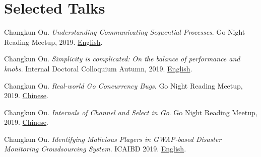 \section{\textbf{Selected Talks}}
\resumeSubHeadingListStart
    \item{
      Changkun Ou.
      \emph{Understanding Communicating Sequential Processes}.
      Go Night Reading Meetup, 2019. \href{https://github.com/changkun/talks/blob/master/201911/csp.pdf}{English}.
    }
    \item{
      Changkun Ou.
      \emph{Simplicity is complicated: On the balance of performance and knobs}.
      Internal Doctoral Colloquium Autumn, 2019. \href{https://github.com/changkun/talks/blob/master/201910/knobs.pdf}{English}.
    }
    \item{
      Changkun Ou.
      \emph{Real-world Go Concurrency Bugs}.
      Go Night Reading Meetup, 2019. \href{https://github.com/changkun/talks/blob/master/201908/channel.pdf}{Chinese}.
    }
    \item{
      Changkun Ou.
      \emph{Internals of Channel and Select in Go}.
      Go Night Reading Meetup, 2019. \href{https://github.com/changkun/talks/blob/master/201908/channel.pdf}{Chinese}.
    }
    \item{
      Changkun Ou.
      \emph{Identifying Malicious Players in GWAP-based Disaster Monitoring Crowdsourcing System}.
      ICAIBD 2019. \href{https://github.com/changkun/talks/blob/master/201905/gwap.pdf}{English}.
    }
